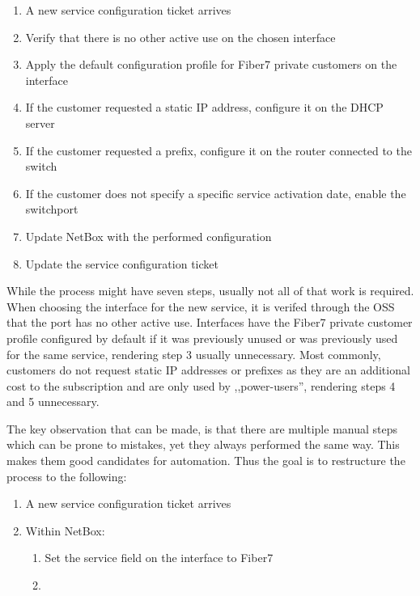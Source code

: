 \begin{enumerate}
  \item A new service configuration ticket arrives
  \item Verify that there is no other active use on the chosen interface
  \item Apply the default configuration profile for Fiber7 private customers on the interface
  \item If the customer requested a static IP address, configure it on the DHCP server
  \item If the customer requested a prefix, configure it on the router connected to the switch
  \item If the customer does not specify a specific service activation date, enable the switchport
  \item Update NetBox with the performed configuration
  \item Update the service configuration ticket
\end{enumerate}

While the process might have seven steps, usually not all of that work is required.
When choosing the interface for the new service, it is verifed through the \acrshort{OSS}
that the port has no other active use.
Interfaces have the Fiber7 private customer profile configured by default
if it was previously unused or was previously used for the same service,
rendering step 3 usually unnecessary.
Most commonly, customers do not request static IP addresses or prefixes as
they are an additional cost to the subscription and are only used by ,,power-users'',
rendering steps 4 and 5 unnecessary.

The key observation that can be made, is that there are multiple manual steps
which can be prone to mistakes, yet they always performed the same way. This makes
them good candidates for automation. Thus the goal is to restructure the process
to the following:

\begin{enumerate}
  \item A new service configuration ticket arrives
  \item Within NetBox:
  \begin{enumerate}
    \item Set the service field on the interface to Fiber7
    \item 
  \end{enumerate}
\end{enumerate}


